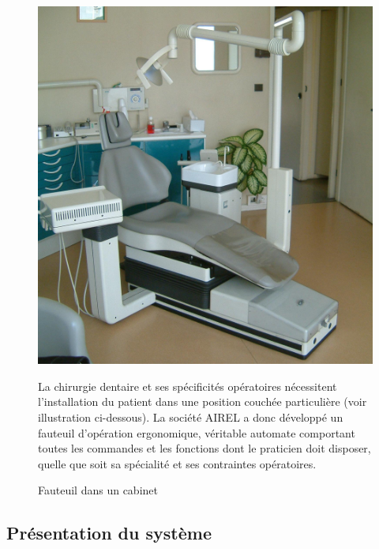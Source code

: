 \begin{figure}[htbp]
\begin{minipage}[c]{.4\linewidth}
\begin{center}
\includegraphics[width=\linewidth]{img/cabinet.jpg}
\caption{Fauteuil dans un cabinet}
\label{fig:imagechaise1}
\end{center}
\end{minipage}
\hfill
\begin{minipage}[c]{.55\linewidth}
La chirurgie dentaire et ses spécificités opératoires nécessitent l'installation du patient dans une position couchée particulière (voir illustration ci-dessous). La société AIREL a donc développé un fauteuil d'opération ergonomique, véritable automate comportant toutes les commandes et les fonctions dont le praticien doit disposer, quelle que soit sa spécialité et ses contraintes opératoires.
\end{minipage}
\end{figure}

\subsection{Présentation du système}

